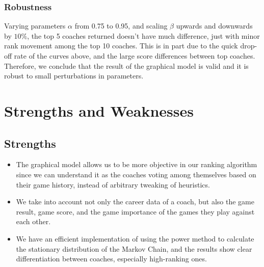 \documentclass[11pt,notitlepage]{article}
\begin{document}
\subsubsection*{Robustness}

\noindent Varying parameters $\alpha$ from 0.75 to 0.95, and scaling $\beta$ upwards and downwards by $10\%$, the top 5 coaches returned doesn't have much difference, just with minor rank movement among the top 10 coaches. This is in part due to the quick drop-off rate of the curves above, and the large score differences between top coaches. Therefore, we conclude that the result of the graphical model is valid and it is robust to small perturbations in parameters.

\section{Strengths and Weaknesses}

\subsection{Strengths}
\begin{itemize}
\item The graphical model allows us to be more objective in our ranking algorithm since we can understand it as the coaches voting among themselves based on their game history, instead of arbitrary tweaking of heuristics.

\item We take into account not only the career data of a coach, but also the game result, game score, and the game importance of the games they play against each other.

\item We have an efficient implementation of using the power method to calculate the stationary distribution of the Markov Chain, and the results show clear differentiation between coaches, especially high-ranking ones.
\end{itemize}
\end{document}
